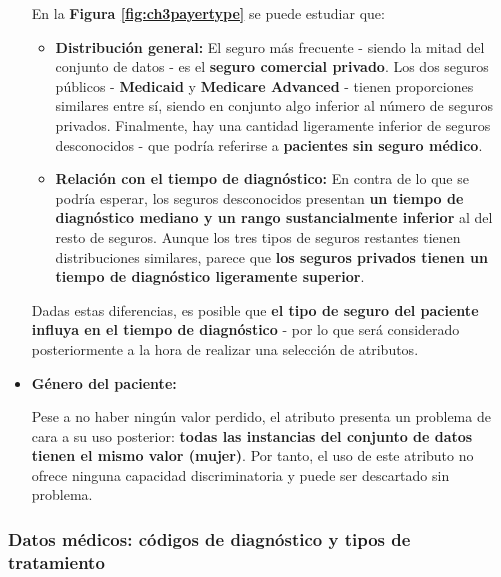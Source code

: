\begin{itemize}[leftmargin=*]
	En la \textbf{Figura \ref{fig:ch3payertype}} se puede estudiar que:
	\begin{itemize}
		\item \textbf{Distribución general:} El seguro más frecuente - siendo la mitad del conjunto de datos - es el \textbf{seguro comercial privado}. Los dos seguros públicos - \textbf{Medicaid} y \textbf{Medicare Advanced} - tienen proporciones similares entre sí, siendo en conjunto algo inferior al número de seguros privados. Finalmente, hay una cantidad ligeramente inferior de seguros desconocidos - que podría referirse a \textbf{pacientes sin seguro médico}.
		\item \textbf{Relación con el tiempo de diagnóstico:} En contra de lo que se podría esperar, los seguros desconocidos presentan \textbf{un tiempo de diagnóstico mediano y un rango sustancialmente inferior} al del resto de seguros. Aunque los tres tipos de seguros restantes tienen distribuciones similares, parece que \textbf{los seguros privados tienen un tiempo de diagnóstico ligeramente superior}.
	\end{itemize}
	
	Dadas estas diferencias, es posible que \textbf{el tipo de seguro del paciente influya en el tiempo de diagnóstico} - por lo que será considerado posteriormente a la hora de realizar una selección de atributos.
	
	\item \textbf{Género del paciente:}
	
	Pese a no haber ningún valor perdido, el atributo presenta un problema de cara a su uso posterior: \textbf{todas las instancias del conjunto de datos tienen el mismo valor (mujer)}. Por tanto, el uso de este atributo no ofrece ninguna capacidad discriminatoria y puede ser descartado sin problema.
	
\end{itemize}

\newpage

\subsubsection{Datos médicos: códigos de diagnóstico y tipos de tratamiento}

